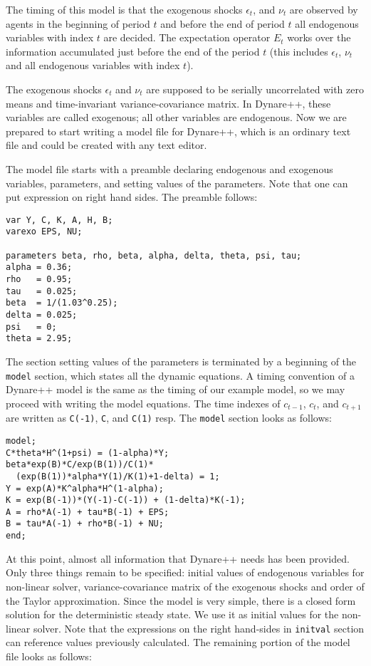 \documentclass[10pt]{article}
\begin{document}
\label{timing}
The timing of this model is that the exogenous shocks $\epsilon_t$,
and $\nu_t$ are observed by agents in the beginning of period $t$ and
before the end of period $t$ all endogenous variables with index $t$
are decided. The expectation operator $E_t$ works over the information
accumulated just before the end of the period $t$ (this includes
$\epsilon_t$, $\nu_t$ and all endogenous variables with index $t$).

The exogenous shocks $\epsilon_t$ and $\nu_t$ are supposed to be
serially uncorrelated with zero means and time-invariant
variance-covariance matrix. In Dynare++, these variables are called
exogenous; all other variables are endogenous. Now we are prepared to
start writing a model file for Dynare++, which is an ordinary text
file and could be created with any text editor.

The model file starts with a preamble declaring endogenous and
exogenous variables, parameters, and setting values of the
parameters. Note that one can put expression on right hand sides. The
preamble follows:

{\small
\begin{verbatim}
var Y, C, K, A, H, B;
varexo EPS, NU;

parameters beta, rho, beta, alpha, delta, theta, psi, tau;
alpha = 0.36;
rho   = 0.95;
tau   = 0.025;
beta  = 1/(1.03^0.25);
delta = 0.025;
psi   = 0;
theta = 2.95;
\end{verbatim}
}

The section setting values of the parameters is terminated by a
beginning of the {\tt model} section, which states all the dynamic
equations. A timing convention of a Dynare++ model is the same as the
timing of our example model, so we may proceed with writing the model
equations. The time indexes of $c_{t-1}$, $c_t$, and $c_{t+1}$ are
written as {\tt C(-1)}, {\tt C}, and {\tt C(1)} resp. The {\tt model}
section looks as follows:

{\small
\begin{verbatim}
model;
C*theta*H^(1+psi) = (1-alpha)*Y;
beta*exp(B)*C/exp(B(1))/C(1)*
  (exp(B(1))*alpha*Y(1)/K(1)+1-delta) = 1;
Y = exp(A)*K^alpha*H^(1-alpha);
K = exp(B(-1))*(Y(-1)-C(-1)) + (1-delta)*K(-1);
A = rho*A(-1) + tau*B(-1) + EPS;
B = tau*A(-1) + rho*B(-1) + NU;
end;
\end{verbatim}
}

At this point, almost all information that Dynare++ needs has been
provided. Only three things remain to be specified: initial values of
endogenous variables for non-linear solver, variance-covariance matrix
of the exogenous shocks and order of the Taylor approximation. Since
the model is very simple, there is a closed form solution for the
deterministic steady state. We use it as initial values for the
non-linear solver. Note that the expressions on the right hand-sides in
{\tt initval} section can reference values previously calculated. The
remaining portion of the model file looks as follows:
\end{document}
